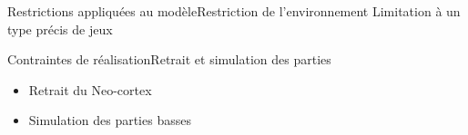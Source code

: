 \begin{frame}{Restrictions appliquées au modèle}{Restriction de l'environnement}
Limitation à un type précis de jeux
\end{frame}

\begin{frame}{Contraintes de réalisation}{Retrait et simulation des parties}
\begin{itemize}
\item Retrait du Neo-cortex
\item Simulation des parties basses
\end{itemize}
\end{frame}
